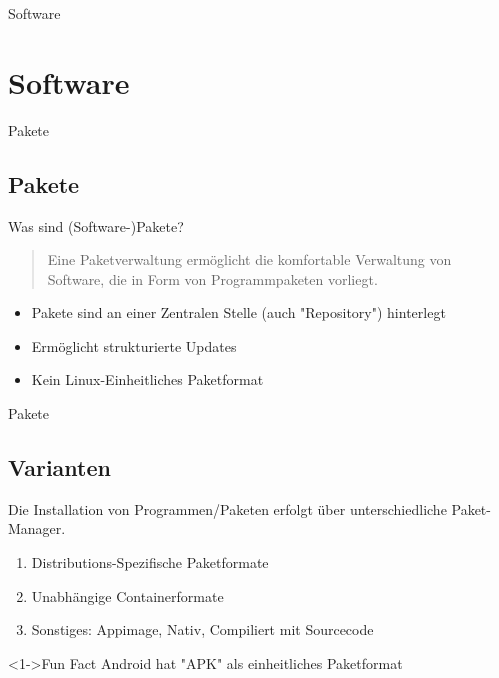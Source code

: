 
\begin{frame}{Software}
    \section{Software}\label{sec:software}
\end{frame}


\begin{frame}{Pakete}
    \subsection{Pakete}\label{subsec:pakete}

    Was sind (Software-)Pakete?
    \pause

    \vspace{0.5cm}
    \begin{quote}
        Eine Paketverwaltung ermöglicht die komfortable Verwaltung von Software, die in Form von Programmpaketen vorliegt.
    \end{quote}
    \pause

    \begin{itemize}
        \item Pakete sind an einer Zentralen Stelle (auch "Repository") hinterlegt\pause
        \item Ermöglicht strukturierte Updates\pause
        \item Kein Linux-Einheitliches Paketformat
    \end{itemize}
\end{frame}

\begin{frame}{Pakete}
    \subsection{Varianten}\label{subsec:varianten}

    Die Installation von Programmen/Paketen erfolgt über unterschiedliche Paket-Manager.

    \begin{enumerate}
        \item<2-> Distributions-Spezifische Paketformate
        \item<3-> Unabhängige Containerformate
        \item<4-> Sonstiges: Appimage, Nativ, Compiliert mit Sourcecode
    \end{enumerate}

    \vspace{0.5cm}
    \begin{exampleblock}<1->{Fun Fact}
        Android hat "APK" als einheitliches Paketformat
    \end{exampleblock}

\end{frame}

